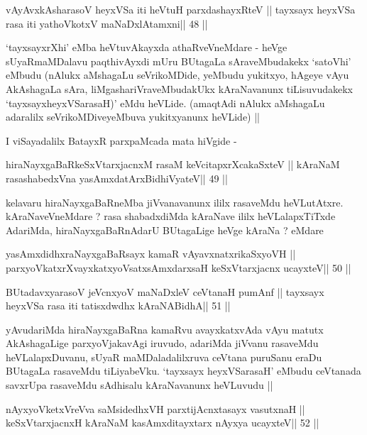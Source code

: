 \begin{shl}
vAyAvxkAsharasoV heyxVSa iti heVtuH parxdashayxRteV ||
tayxsayx heyxVSa rasa iti yathoVkotxV maNaDxlAtamxni\hfill || 48 ||
\end{shl}

\begin{artha}
`tayxsayxrXhi' eMba heVtuvAkayxda athaRveVneMdare - heVge
sUyaRmaMDalavu paqthivAyxdi mUru BUtagaLa sAraveMbudakekx `satoVhi'
eMbudu (nAlukx aMshagaLu seVrikoMDide, yeMbudu yukitxyo, hAgeye vAyu
AkAshagaLa sAra, liMgashariVraveMbudakUkx kAraNavanunx tiLisuvudakekx
`tayxsayxheyxVSarasaH)' eMdu heVLide. (amaqtAdi nAlukx aMshagaLu
adaralilx seVrikoMDiveyeMbuva yukitxyanunx heVLide) ||

I viSayadalilx BatayxR parxpaMcada mata hiVgide -
\end{artha}

\begin{shl}
hiraNayxgaBaRkeSxVtarxjacnxM rasaM keVcitapxrXcakaSxteV ||
kAraNaM rasashabedxVna yasAmxdatArxBidhiVyateV\hfill || 49 ||
\end{shl}

\begin{artha}
kelavaru hiraNayxgaBaRneMba jiVvanavanunx ililx rasaveMdu
heVLutAtxre. kAraNaveVneMdare ? rasa shabadxdiMda kAraNave ililx
heVLalapxTiTxde AdariMda, hiraNayxgaBaRnAdarU BUtagaLige heVge kAraNa
? eMdare
\end{artha}

\begin{shl}
yasAmxdidhxraNayxgaBaRsayx kamaR vAyavxnatxrikaSxyoVH ||
parxyoVkatxrXvayxkatxyoVsatxsAmxdarxsaH keSxVtarxjacnx ucayxteV\hfill || 50 ||
\end{shl}

\begin{shl}
BUtadavxyarasoV jeVcnxyoV maNaDxleV ceVtanaH pumAnf ||
tayxsayx heyxVSa rasa iti tatisxdwdhx kAraNABidhA\hfill || 51 ||
\end{shl}

\begin{artha}
yAvudariMda hiraNayxgaBaRna kamaRvu avayxkatxvAda vAyu matutx
AkAshagaLige parxyoVjakavAgi iruvudo, adariMda jiVvanu rasaveMdu
heVLalapxDuvanu, sUyaR maMDaladalilxruva ceVtana puruSanu eraDu
BUtagaLa rasaveMdu tiLiyabeVku. `tayxsayx heyxVSarasaH' eMbudu
ceVtanada savxrUpa rasaveMdu sAdhisalu kAraNavanunx heVLuvudu ||
\end{artha}

\begin{shl}
nAyxyoVketxVreVva saMsidedhxVH parxtijAcnxtasayx vasutxnaH ||
keSxVtarxjacnxH kAraNaM kasAmxditayxtarx nAyxya ucayxteV\hfill || 52 ||
\end{shl}

